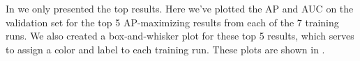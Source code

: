 \begin{comment}
import kwutil
print(round(kwutil.timedelta.coerce('07:52:02').to_pint().to('hours'), 2))
print(round(kwutil.timedelta.coerce('00:13:29').to_pint().to('hours'), 2))
print(round(kwutil.timedelta.coerce('04:23:34').to_pint().to('hours'), 2))
print(round(kwutil.timedelta.coerce('00:07:32').to_pint().to('hours'), 2))

print(round(kwutil.timedelta.coerce(kwutil.timedelta.coerce('4 days') + kwutil.timedelta.coerce('14:18:23')).to_pint().to('days'), 2))
print(round(kwutil.timedelta.coerce(kwutil.timedelta.coerce('6 days') + kwutil.timedelta.coerce('06:52:11')).to_pint().to('days'), 2))
print(round(kwutil.timedelta.coerce('00:20:07').to_pint().to('hours'), 2))
print(round(kwutil.timedelta.coerce('00:27:31').to_pint().to('hours'), 2))

# Prediction kwh/days ratio
(4.39 / 3.17)

# Prediction kwh/carbon ratio
85.31/17.95
3.17 / 0.67

# training kwh/days ratio
(39.22 * 24) / 324.75
1_316.07 / 276.37
324.75 / 68.20
\end{comment}


In  we only presented the top results.
Here we've plotted the AP and AUC on the validation set for the top 5 AP-maximizing results from each of the
  7 training runs.
We also created a box-and-whisker plot for these top 5 results, which serves to assign a color and label to
  each training run.
These plots are shown in .






